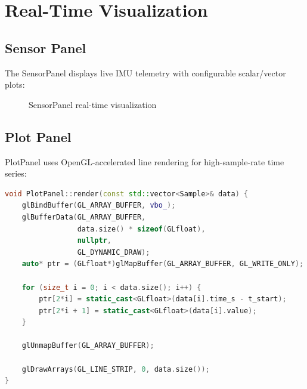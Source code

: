 \section{Real-Time Visualization}

\subsection{Sensor Panel}

The SensorPanel displays live IMU telemetry with configurable scalar/vector plots:

\begin{figure}[h]
    \centering
    \caption{SensorPanel real-time visualization}
    \label{fig:sensor_panel}
\end{figure}

\subsection{Plot Panel}

PlotPanel uses OpenGL-accelerated line rendering for high-sample-rate time series:

\begin{lstlisting}[language=c++]
void PlotPanel::render(const std::vector<Sample>& data) {
    glBindBuffer(GL_ARRAY_BUFFER, vbo_);
    glBufferData(GL_ARRAY_BUFFER,
                 data.size() * sizeof(GLfloat),
                 nullptr,
                 GL_DYNAMIC_DRAW);
    auto* ptr = (GLfloat*)glMapBuffer(GL_ARRAY_BUFFER, GL_WRITE_ONLY);

    for (size_t i = 0; i < data.size(); i++) {
        ptr[2*i] = static_cast<GLfloat>(data[i].time_s - t_start);
        ptr[2*i + 1] = static_cast<GLfloat>(data[i].value);
    }

    glUnmapBuffer(GL_ARRAY_BUFFER);

    glDrawArrays(GL_LINE_STRIP, 0, data.size());
}
\end{lstlisting}

